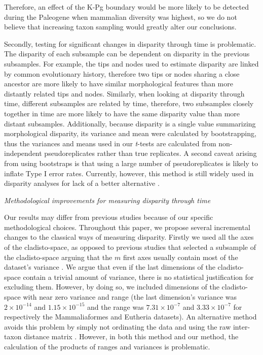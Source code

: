\documentclass[12pt,letterpaper]{article}
\renewcommand{\subsection}[1]{%
\bigskip
\begin{center}
\begin{large}
\normalfont\itshape #1
\end{large}
\end{center}}
\begin{document}
Therefore, an effect of the K-Pg boundary would be more likely to be detected during the Paleogene when mammalian diversity was highest, so we do not believe that increasing taxon sampling would greatly alter our conclusions.

Secondly, testing for significant changes in disparity through time is problematic.
The disparity of each subsample can be dependent on disparity in the previous subsamples.
For example, the tips and nodes used to estimate disparity are linked by common evolutionary history, therefore two tips or nodes sharing a close ancestor are more likely to have similar morphological features than more distantly related tips and nodes.
Similarly, when looking at disparity through time, different subsamples are related by time, therefore, two subsamples closely together in time are more likely to have the same disparity value than more distant subsamples.
Additionally, because disparity is a single value summarizing morphological disparity, its variance and mean were calculated by bootstrapping, thus the variances and means used in our \textit{t}-tests are calculated from non-independent pseudoreplicates rather than true replicates.
A second caveat arising from using bootstraps is that using a large number of pseudoreplicates is likely to inflate Type I error rates. 
Currently, however, this method is still widely used in disparity analyses for lack of a better alternative \citep[e.g.][]{anderson2012using,zelditch2012geometric,smith2014joined}.

\subsection{Methodological improvements for measuring disparity through time}
Our results may differ from previous studies because of our specific methodological choices.
Throughout this paper, we propose several incremental changes to the classical ways of measuring disparity.
Firstly we used all the axes of the cladisto-space, as opposed to previous studies that selected a subsample of the cladisto-space arguing that the $m$ first axes usually contain most of the dataset's variance \citep[e.g][]{brusatte50,cisneros2010,prentice2011,anderson2012using,Hughes20082013,bentonmodels2014}.
We argue that even if the last dimensions of the cladisto-space contain a trivial amount of variance, there is no statistical justification for excluding them.
However, by doing so, we included dimensions of the cladisto-space with near zero variance and range (the last dimension's variance was $2\times10^{-14}$ and $1.15\times10^{-15}$ and the range was $7.31\times10^{-7}$ and $3.33\times10^{-7}$ for respectively the Mammaliaformes and Eutheria datasets).
An alternative method avoids this problem by simply not ordinating the data and using the raw inter-taxon distance matrix \citep[e.g.][]{bensonfaunal2014,Close2015}. 
However, in both this method and our method, the calculation of the products of ranges and variances is problematic.
\end{document}
